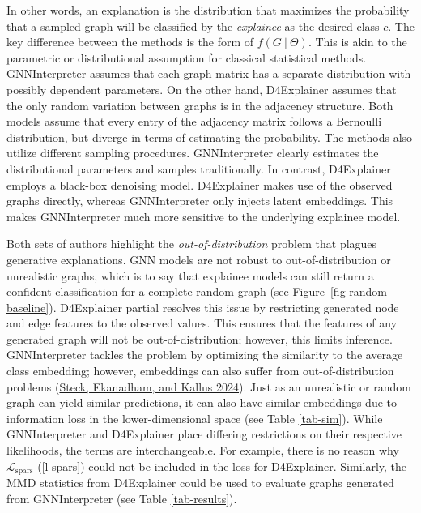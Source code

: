 \documentclass[
  11pt,
  letterpaper,
]{article}
\begin{document}
In other words, an explanation is the distribution that maximizes the
probability that a sampled graph will be classified by the
\emph{explainee} as the desired class \(c\). The key difference between
the methods is the form of \(f(G \ | \ \Theta)\). This is akin to the
parametric or distributional assumption for classical statistical
methods. GNNInterpreter assumes that each graph matrix has a separate
distribution with possibly dependent parameters. On the other hand,
D4Explainer assumes that the only random variation between graphs is in
the adjacency structure. Both models assume that every entry of the
adjacency matrix follows a Bernoulli distribution, but diverge in terms
of estimating the probability. The methods also utilize different
sampling procedures. GNNInterpreter clearly estimates the distributional
parameters and samples traditionally. In contrast, D4Explainer employs a
black-box denoising model. D4Explainer makes use of the observed graphs
directly, whereas GNNInterpreter only injects latent embeddings. This
makes GNNInterpreter much more sensitive to the underlying explainee
model.

\quad Both sets of authors highlight the \emph{out-of-distribution}
problem that plagues generative explanations. GNN models are not robust
to out-of-distribution or unrealistic graphs, which is to say that
explainee models can still return a confident classification for a
complete random graph (see Figure~\ref{fig-random-baseline}).
D4Explainer partial resolves this issue by restricting generated node
and edge features to the observed values. This ensures that the features
of any generated graph will not be out-of-distribution; however, this
limits inference. GNNInterpreter tackles the problem by optimizing the
similarity to the average class embedding; however, embeddings can also
suffer from out-of-distribution problems
(\protect\hyperlink{ref-Steck_Ekanadham_Kallus_2024}{Steck, Ekanadham,
and Kallus 2024}). Just as an unrealistic or random graph can yield
similar predictions, it can also have similar embeddings due to
information loss in the lower-dimensional space (see Table
\ref{tab-sim}). While GNNInterpreter and D4Explainer place differing
restrictions on their respective likelihoods, the terms are
interchangeable. For example, there is no reason why
\(\mathcal{L}_\text{spars}\) (\ref{l-spars}) could not be included in
the loss for D4Explainer. Similarly, the MMD statistics from D4Explainer
could be used to evaluate graphs generated from GNNInterpreter (see
Table \ref{tab-results}).
\end{document}

